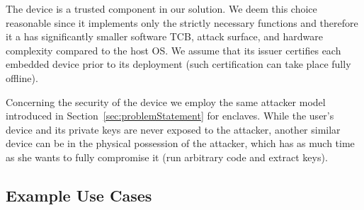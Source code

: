 \ifusenix
\vspace{-15pt}
\else
\fi
{}
The \device device is a trusted component in our solution. We deem this choice reasonable since it implements only the strictly necessary functions and therefore it a has significantly smaller software TCB, attack surface, and hardware complexity compared to the host OS. 
We assume that its issuer certifies each embedded device prior to its deployment (such certification can take place fully offline). %

Concerning the security of the \device device we employ the same attacker model introduced in Section~\ref{sec:problemStatement} for enclaves. While the user's device and its private keys are never exposed to the attacker, another similar device can be in the physical possession of the attacker, which has as much time as she wants to fully compromise it (run arbitrary code and extract keys). %



\subsection{Example Use Cases}
\label{sec:use-cases}

% 

